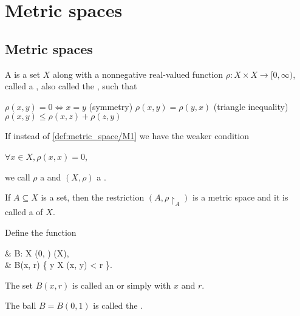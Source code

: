 \section{Metric spaces}\label{sec:metric_spaces}
\subsection{Metric spaces}\label{subsec:metric_spaces}

\begin{definition}\label{def:metric_space}
  A  is a set \( X \) along with a nonnegative real-valued function \( \rho: X \times X \to [0, \infty) \), called a , also called the , such that
  \begin{DefEnum}[series=def:metric_space]
     \( \rho(x, y) = 0 \iff x = y \)
    (symmetry) \( \rho(x, y) = \rho(y, x) \)
    (triangle inequality) \( \rho(x, y) \leq \rho(x, z) + \rho(z, y) \)
  \end{DefEnum}

  If instead of \ref{def:metric_space/M1} we have the weaker condition
  \begin{DefEnum}[resume=def:metric_space]
     \( \forall x \in X, \rho(x, x) = 0 \),
  \end{DefEnum}
  we call \( \rho \) a  and \( (X, \rho) \) a .

  \begin{DefEnum}
     If \( A \subseteq X \) is a set, then the restriction \( (A, \rho{\restriction_A}) \) is a metric space and it is called a  of $X$.

     Define the function
    \begin{BreakableAlign*}
       & B: X \times (0, \infty) \to \Pow(X),                   \\
       & B(x, r) \coloneqq \{ y \in X \colon \rho(x, y) < r \}.
    \end{BreakableAlign*}

    The set \( B(x, r) \) is called an  or simply  with  \( x \) and  \( r \).

    The ball \( B = B(0, 1) \) is called the .


\end{DefEnum}
\end{definition}
